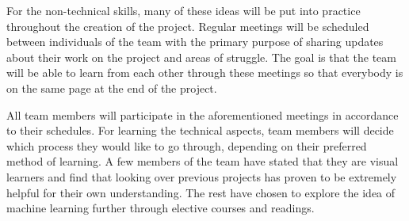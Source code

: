 \documentclass[12pt]{article}
\begin{document}
\begin{enumerate}
For the non-technical skills, many of these ideas will be put into practice
throughout the creation of the project. Regular meetings will be scheduled
between individuals of the team with the primary purpose of sharing updates
about their work on the project and areas of struggle. The goal is that the team
will be able to learn from each other through these meetings so that everybody
is on the same page at the end of the project.

All team members will participate in the aforementioned meetings in accordance
to their schedules. For learning the technical aspects, team members will decide
which process they would like to go through, depending on their preferred method
of learning. A few members of the team have stated that they are visual learners
and find that looking over previous projects has proven to be extremely helpful
for their own understanding. The rest have chosen to explore the idea of machine
learning further through elective courses and readings.

\end{enumerate}
\end{document}
